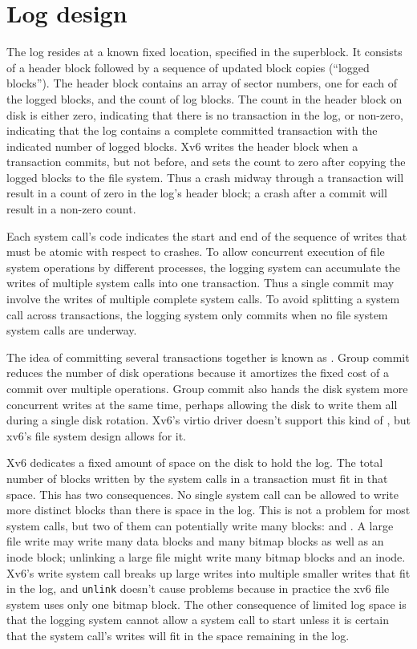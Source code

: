 \section{Log design}

The log resides at a known fixed location, specified in the superblock.
It consists of a header block followed by a sequence
of updated block copies (``logged blocks'').
The header block contains an array of sector
numbers, one for each of the logged blocks, and 
the count of log blocks.
The count in the header block on disk is either
zero, indicating that there is no transaction in the log,
or non-zero, indicating that the log contains a complete committed
transaction with the indicated number of logged blocks.
Xv6 writes the header
block when a transaction commits, but not before, and sets the
count to zero after copying the logged blocks to the file system.
Thus a crash midway through a transaction will result in a
count of zero in the log's header block; a crash after a commit
will result in a non-zero count.

Each system call's code indicates the start and end of the sequence of
writes that must be atomic with respect to crashes.
To allow concurrent execution of file system operations
by different processes,
the logging system can accumulate the writes
of multiple system calls into one transaction.
Thus a single commit may involve the writes of multiple
complete system calls.
To avoid splitting a system call across transactions, the logging system
only commits when no file system system calls are underway.

The idea of committing several transactions together is known as 
.
Group commit reduces the number of disk operations
because it amortizes the fixed cost of a commit over multiple
operations.
Group commit also hands the disk system more concurrent writes
at the same time, perhaps allowing the disk to write
them all during a single disk rotation.
Xv6's virtio driver doesn't support this kind of
,
but xv6's file system design allows for it.

Xv6 dedicates a fixed amount of space on the disk to hold the log.
The total number of blocks written by the system calls in a
transaction must fit in that space.
This has two consequences.
No single system call
can be allowed to write more distinct blocks than there is space
in the log. This is not a problem for most system calls, but two
of them can potentially write many blocks: 
and
.
A large file write may write many data blocks and many bitmap blocks
as well as an inode block; unlinking a large file might write many
bitmap blocks and an inode.
Xv6's write system call breaks up large writes into multiple smaller
writes that fit in the log,
and 
\lstinline{unlink}
doesn't cause problems because in practice the xv6 file system uses
only one bitmap block.
The other consequence of limited log space
is that the logging system cannot allow a system call to start
unless it is certain that the system call's writes will
fit in the space remaining in the log.
